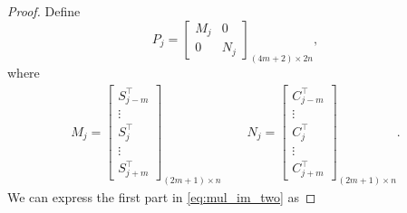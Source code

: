 \begin{proof}
Define
\begin{equation}
P_j = \left[ 
\begin{array}{ll}
M_j & 0 \\
0 & N_j 
\end{array}
\right]_{(4m+2)\times{2n}}, 
\end{equation}
where 
\begin{align}
M_j=\begin{bmatrix}
S_{j-m}^\top\\
\vdots \\
S_j^\top\\
\vdots \\
S_{j+m}^\top
\end{bmatrix}_{(2m+1)\times n}  \qquad
N_j =\begin{bmatrix}
C_{j-m}^\top\\
\vdots \\
C_j^\top\\
\vdots \\
C_{j+m}^\top
\end{bmatrix}_{(2m+1)\times n}.
\end{align}
We can express the first part in \eqref{eq:mul_im_two} as 


\end{proof}
